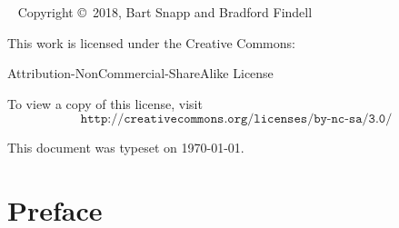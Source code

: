 

\newpage

\begin{fullwidth}
~\vfill
\thispagestyle{empty}
\setlength{\parindent}{0pt}
\setlength{\parskip}{\baselineskip}
Copyright \copyright~2018, Bart Snapp and Bradford Findell

\vspace{.5cm}

\noindent
This work is licensed under the Creative Commons:
\begin{center}
Attribution-NonCommercial-ShareAlike License 
\end{center}
To view a copy of this license, visit
\[
\texttt{http://creativecommons.org/licenses/by-nc-sa/3.0/}
\]


\vspace{.5cm}
\noindent This document was typeset on \today.
\end{fullwidth}


\chapter*{Preface}


